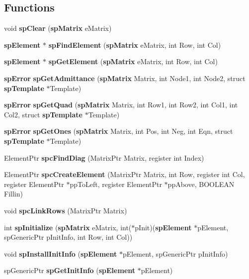 \subsection*{Functions}
\begin{CompactItemize}
\item 
void {\bf sp\-Clear} ({\bf sp\-Matrix} e\-Matrix)
\item 
{\bf sp\-Element} $\ast$ {\bf sp\-Find\-Element} ({\bf sp\-Matrix} e\-Matrix, int Row, int Col)
\item 
{\bf sp\-Element} $\ast$ {\bf sp\-Get\-Element} ({\bf sp\-Matrix} e\-Matrix, int Row, int Col)
\item 
{\bf sp\-Error} {\bf sp\-Get\-Admittance} ({\bf sp\-Matrix} Matrix, int Node1, int Node2, struct {\bf sp\-Template} $\ast$Template)
\item 
{\bf sp\-Error} {\bf sp\-Get\-Quad} ({\bf sp\-Matrix} Matrix, int Row1, int Row2, int Col1, int Col2, struct {\bf sp\-Template} $\ast$Template)
\item 
{\bf sp\-Error} {\bf sp\-Get\-Ones} ({\bf sp\-Matrix} Matrix, int Pos, int Neg, int Eqn, struct {\bf sp\-Template} $\ast$Template)
\item 
{}
Element\-Ptr {\bf spc\-Find\-Diag} (Matrix\-Ptr Matrix, register int Index)\label{spBuild_8c_a16}

\item 
{}
Element\-Ptr {\bf spc\-Create\-Element} (Matrix\-Ptr Matrix, int Row, register int Col, register Element\-Ptr $\ast$pp\-To\-Left, register Element\-Ptr $\ast$pp\-Above, BOOLEAN Fillin)\label{spBuild_8c_a17}

\item 
{}
void {\bf spc\-Link\-Rows} (Matrix\-Ptr Matrix)\label{spBuild_8c_a18}

\item 
int {\bf sp\-Initialize} ({\bf sp\-Matrix} e\-Matrix, int($\ast$p\-Init)({\bf sp\-Element} $\ast$p\-Element, sp\-Generic\-Ptr p\-Init\-Info, int Row, int Col))
\item 
void {\bf sp\-Install\-Init\-Info} ({\bf sp\-Element} $\ast$p\-Element, sp\-Generic\-Ptr p\-Init\-Info)
\item 
sp\-Generic\-Ptr {\bf sp\-Get\-Init\-Info} ({\bf sp\-Element} $\ast$p\-Element)
\end{CompactItemize}


